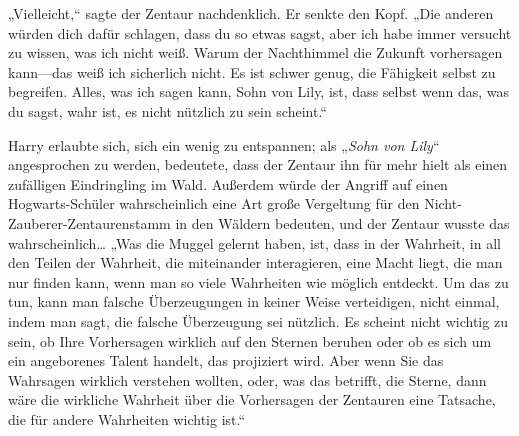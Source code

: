 „Vielleicht,“ sagte der Zentaur nachdenklich. Er senkte den Kopf. „Die anderen würden dich dafür schlagen, dass du so etwas sagst, aber ich habe immer versucht zu wissen, was ich nicht weiß. Warum der Nachthimmel die Zukunft vorhersagen kann—das weiß ich sicherlich nicht. Es ist schwer genug, die Fähigkeit selbst zu begreifen. Alles, was ich sagen kann, Sohn von Lily, ist, dass selbst wenn das, was du sagst, wahr ist, es nicht nützlich zu sein scheint.“

Harry erlaubte sich, sich ein wenig zu entspannen; als „\emph{Sohn von Lily}“ angesprochen zu werden, bedeutete, dass der Zentaur ihn für mehr hielt als einen zufälligen Eindringling im Wald. Außerdem würde der Angriff auf einen Hogwarts-Schüler wahrscheinlich eine Art große Vergeltung für den Nicht-Zauberer-Zentaurenstamm in den Wäldern bedeuten, und der Zentaur wusste das wahrscheinlich…
„Was die Muggel gelernt haben, ist, dass in der Wahrheit, in all den Teilen der Wahrheit, die miteinander interagieren, eine Macht liegt, die man nur finden kann, wenn man so viele Wahrheiten wie möglich entdeckt. Um das zu tun, kann man falsche Überzeugungen in keiner Weise verteidigen, nicht einmal, indem man sagt, die falsche Überzeugung sei nützlich. Es scheint nicht wichtig zu sein, ob Ihre Vorhersagen wirklich auf den Sternen beruhen oder ob es sich um ein angeborenes Talent handelt, das projiziert wird. Aber wenn Sie das Wahrsagen wirklich verstehen wollten, oder, was das betrifft, die Sterne, dann wäre die wirkliche Wahrheit über die Vorhersagen der Zentauren eine Tatsache, die für andere Wahrheiten wichtig ist.“

